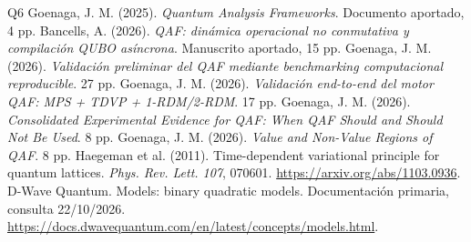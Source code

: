 \begin{thebibliography}{Q6}
 Goenaga, J. M. (2025). \emph{Quantum Analysis Frameworks}. Documento aportado, 4 pp.
 Bancells, A. (2026). \emph{QAF: dinámica operacional no conmutativa y compilación QUBO asíncrona}. Manuscrito aportado, 15 pp.
 Goenaga, J. M. (2026). \emph{Validación preliminar del QAF mediante benchmarking computacional reproducible}. 27 pp.
 Goenaga, J. M. (2026). \emph{Validación end-to-end del motor QAF: MPS + TDVP + 1-RDM/2-RDM}. 17 pp.
 Goenaga, J. M. (2026). \emph{Consolidated Experimental Evidence for QAF: When QAF Should and Should Not Be Used}. 8 pp.
 Goenaga, J. M. (2026). \emph{Value and Non-Value Regions of QAF}. 8 pp.
 Haegeman et al. (2011). Time-dependent variational principle for quantum lattices. \emph{Phys. Rev. Lett. 107}, 070601. \url{https://arxiv.org/abs/1103.0936}.
 D-Wave Quantum. Models: binary quadratic models. Documentación primaria, consulta 22/10/2026. \url{https://docs.dwavequantum.com/en/latest/concepts/models.html}.
\end{thebibliography}

